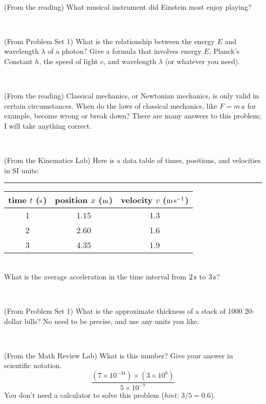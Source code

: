 \documentclass[12pt, letterpaper]{article}
\begin{document}
\vfill ~

\begin{problem} (From the reading)
What musical instrument did Einstein most enjoy playing?
\end{problem}


\vfill ~

\begin{problem} (From Problem Set 1)
What is the relationship between the energy $E$ and wavelength
$\lambda$ of a photon? Give a formula that involves energy $E$,
Planck's Constant $h$, the speed of light $c$, and wavelength
$\lambda$ (or whatever you need).
\end{problem}

\vfill ~


\clearpage


\begin{problem} (From the reading)
Classical mechanics, or Newtonian mechanics, is only valid in certain
circumstances. When do the laws of classical mechanics, like $F =
m\,a$ for example, become wrong or break down? There are many answers
to this problem; I will take anything correct.
\end{problem}


\vfill ~

\begin{problem} (From the Kinematics Lab)
Here is a data table of times, positions, and velocities in SI units:\\
\rule{1.0in}{0pt}\begin{tabular}{c|c|c}
time $t$ ($\mathrm{s}$) & position $x$ ($\mathrm{m}$) & velocity $v$ ($\mathrm{m}\,\mathrm{s}^{-1}$) \\
\hline
1 & 1.15 & 1.3 \\
2 & 2.60 & 1.6 \\
3 & 4.35 & 1.9 \\
\hline
\end{tabular}\\
What is the average acceleration in the time interval from $2\,\mathrm{s}$ to $3\,\mathrm{s}$?
\end{problem}


\vfill ~

\begin{problem} (From Problem Set 1)
What is the approximate thickness of a stack of 1000 20-dollar bills?
No need to be precise, and use any units you like.
\end{problem}


\vfill ~

\begin{problem} (From the Math Review Lab)
What is this number? Give your answer in scientific notation.
$$
\frac{(7\times10^{-34})\times(3\times10^8)}{5\times10^{-7}}
$$
You don't need a calculator to solve this problem (\textit{hint: $3/5=0.6$}).
\end{problem}
\end{document}
